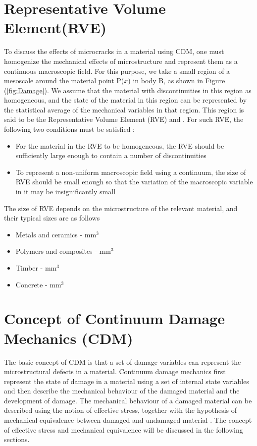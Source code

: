 \documentclass[12pt,a4paper,twoside,openright]{report}
\begin{document}
\section{Representative Volume Element(RVE)}
\indent\indent\indent  To discuss the effects of microcracks in a material using CDM, one must homogenize the mechanical effects of microstructure and represent them as a continuous macroscopic field. For this purpose, we take a small region of a mesoscale around the material point P($x$) in body B, as shown in Figure (\ref{fig:Damage}). We assume that the material with discontinuities in this region as homogeneous, and the state of the material in this region can be represented by the statistical average of the mechanical variables in that region. This region is said to be the Representative Volume Element (RVE) \citep{hill1963elastic} and \citep{hashin1983analysis}. For such RVE, the following two conditions must be satisfied \citep{murakami2012continuum}:
\begin{itemize}
\item  For the material in the RVE to be homogeneous, the RVE should be sufficiently large enough to contain a number of discontinuities
\item To represent a non-uniform macroscopic field using a continuum, the size of RVE should be small enough so that the variation of the macroscopic variable in it may be insignificantly small 
\end{itemize}
The size of RVE depends on the microstructure of the relevant material, and their typical sizes are as follows \citep{lemaitre2012course}
\begin{itemize}
\item Metals and ceramics  \;    -    \;mm$^3$
\item Polymers and composites \;   -   \;mm$^3$
\item Timber\; - \;mm$^3$
\item Concrete \; - \;mm$^3$
\end{itemize}

\section{Concept of Continuum Damage Mechanics (CDM)}
\indent\indent\indent The basic concept of CDM is that a set of damage variables can represent the microstructural defects in a material. Continuum damage mechanics first represent the state of damage in a material using a set of internal state variables and then describe the mechanical behaviour of the damaged material and the development of damage. The mechanical behaviour of a damaged material can be described using the notion of effective stress, together with the hypothesis of mechanical equivalence between damaged and undamaged material \citep{murakami2012continuum}. The concept of effective stress and mechanical equivalence will be discussed in the following sections.
\end{document}
